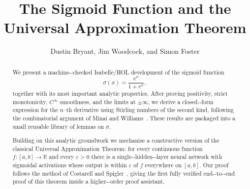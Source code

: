 \documentclass[11pt,a4paper]{article}
\begin{document}
\title{The Sigmoid Function and the Universal Approximation
Theorem}
\author{Dustin Bryant, Jim Woodcock, and Simon Foster}
\maketitle


\begin{abstract}
We present a machine-‑checked Isabelle/HOL development of the sigmoid
function
\[
  \sigma(x)=\frac{e^{x}}{1+e^{x}},
\]
together with its most important analytic properties.  After proving
positivity, strict monotonicity, \(C^{\infty}\) smoothness, and the
limits at \(\pm\infty\), we derive a closed-‑form expression for the
\(n\)--th derivative using Stirling numbers of the second kind, following
the combinatorial argument of Minai and Williams~\cite{MINAI1993845}.
These results are packaged into a small reusable library of lemmas on
\(\sigma\).

Building on this analytic groundwork we mechanise a constructive version
of the classical Universal Approximation Theorem: for every continuous
function \(f\colon[a,b]\to\mathbb{R}\) and every \(\varepsilon>0\) there
is a single-‑hidden-‑layer neural network with sigmoidal activations whose
output is within \(\varepsilon\) of \(f\) everywhere on \([a,b]\).  Our
proof follows the method of Costarell and Spigler~\cite{CostarelliSpigler},
giving the first fully verified end-‑to-‑end proof of this
theorem inside a higher-‑order proof assistant.
\end{abstract}



\tableofcontents



\nocite{*}



\end{document}
